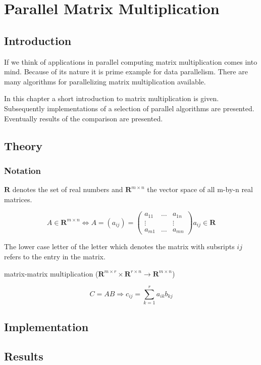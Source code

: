 \chapter{Parallel Matrix Multiplication}
\label{chap:matrix}
\section{Introduction}

If we think of applications in parallel computing matrix
multiplication comes into mind. Because of its nature it is prime
example for data parallelism. There are many algorithms for
parallelizing matrix multiplication available.


In this chapter a short introduction to matrix multiplication is
given. Subsequently implementations of a selection of parallel
algorithms are presented. Eventually results of the comparison are
presented.


\section{Theory}

\subsection{Notation}

$ \mathbf{R} $ denotes the set of real numbers and $ \mathbf{R}^{m
  \times n} $ the vector space of all m-by-n real matrices.

$$ A \in \mathbf{R}^{m \times n} \Longleftrightarrow A = (a_{ij}) = 
\left( \begin{array}{ccc}
a_{11} & \ldots & a_{1n} \\
\vdots &        & \vdots \\
a_{m1} & \ldots & a_{mn}
\end{array} \right)
a_{ij} \in \mathbf{R}
 $$

The lower case letter of the letter which denotes the matrix with
subsripts $ij$ refers to the entry in the matrix. 

matrix-matrix multiplication ($\mathbf{R}^{m \times r} \times
\mathbf{R}^{r \times n} \to \mathbf{R}^{m \times n}$)

$$ C = AB \Longrightarrow c_{ij} = \sum_{k=1}^r a_{ik}b_{kj} $$


\section{Implementation}



\section{Results}

